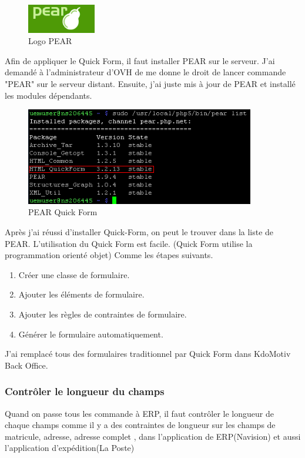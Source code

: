 \begin{figure}[hbtp]
\centering
\includegraphics[width=3cm]{body/images/pear_logo.png}
\caption{Logo PEAR}
\end{figure}


Afin de appliquer le Quick Form, il faut installer PEAR sur le serveur. J'ai demandé à l'administrateur d'OVH de me donne le droit de lancer commande "PEAR" sur le serveur distant. Ensuite, j'ai juste mis à jour de PEAR et installé  les modules dépendants. 

\begin{figure}[hbtp]
\centering
\includegraphics[width=10cm]{body/images/pear_quickform.png}
\caption{PEAR Quick Form}
\end{figure}

Après j'ai réussi d'installer Quick-Form, on peut le trouver dans la liste de PEAR. L'utilisation du Quick Form est facile. (Quick Form utilise la programmation orienté objet) Comme les étapes suivants.
\begin{enumerate}
\item Créer une classe de formulaire.
\item Ajouter les éléments de formulaire.
\item Ajouter les règles de contraintes de formulaire.
\item Générer le formulaire automatiquement. 
\end{enumerate}

J'ai remplacé tous des formulaires traditionnel par Quick Form dans KdoMotiv Back Office.

\subsubsection{Contrôler le longueur du champs}
Quand on passe tous les commande à ERP, il faut contrôler le longueur de chaque champs comme il y a des contraintes de longueur sur les champs de matricule, adresse, adresse complet , dans l'application de ERP(Navision) et aussi l'application d'expédition(La Poste)

